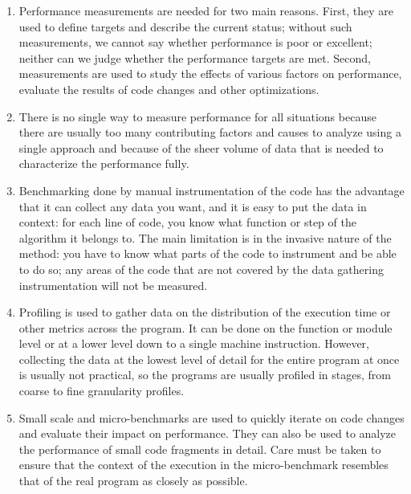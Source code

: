 \begin{enumerate}
\item 
Performance measurements are needed for two main reasons. First, they are used to define targets and describe the current status; without such measurements, we cannot say whether performance is poor or excellent; neither can we judge whether the performance targets are met. Second, measurements are used to study the effects of various factors on performance, evaluate the results of code changes and other optimizations.

\item 
There is no single way to measure performance for all situations because there are usually too many contributing factors and causes to analyze using a single approach and because of the sheer volume of data that is needed to characterize the performance fully.

\item 
Benchmarking done by manual instrumentation of the code has the advantage that it can collect any data you want, and it is easy to put the data in context: for each line of code, you know what function or step of the algorithm it belongs to. The main limitation is in the invasive nature of the method: you have to know what parts of the code to instrument and be able to do so; any areas of the code that are not covered by the data gathering instrumentation will not be measured.

\item
Profiling is used to gather data on the distribution of the execution time or other metrics across the program. It can be done on the function or module level or at a lower level down to a single machine instruction. However, collecting the data at the lowest level of detail for the entire program at once is usually not practical, so the programs are usually profiled in stages, from coarse to fine granularity profiles.

\item
Small scale and micro-benchmarks are used to quickly iterate on code changes and evaluate their impact on performance. They can also be used to analyze the performance of small code fragments in detail. Care must be taken to ensure that the context of the execution in the micro-benchmark resembles that of the real program as closely as possible.
	
\end{enumerate}